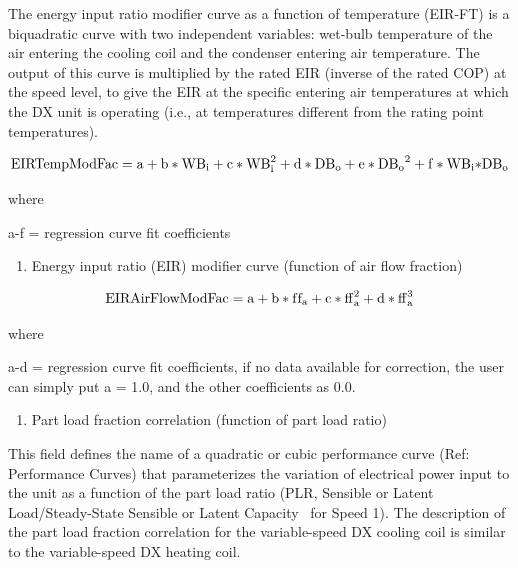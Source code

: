 The energy input ratio modifier curve as a function of temperature (EIR-FT) is a biquadratic curve with two independent variables: wet-bulb temperature of the air entering the cooling coil and the condenser entering air temperature. The output of this curve is multiplied by the rated EIR (inverse of the rated COP) at the speed level, to give the EIR at the specific entering air temperatures at which the DX unit is operating (i.e., at temperatures different from the rating point temperatures).

\begin{equation}
{\rm{EIRTempModFac}} = {\rm{a}} + {\rm{b*W}}{{\rm{B}}_{\rm{i}}} + {\rm{c*WB}}_{\rm{i}}^2 + {\rm{d*D}}{{\rm{B}}_{\rm{o}}} + {\rm{e*D}}{{\rm{B}}_{\rm{o}}}^2 + {\rm{f*W}}{{\rm{B}}_{\rm{i}}}{\rm{*D}}{{\rm{B}}_{\rm{o}}}
\end{equation}

where

a-f = regression curve fit coefficients

\begin{enumerate}
\def\labelenumi{\arabic{enumi})}
\setcounter{enumi}{3}
\tightlist
\item
  Energy input ratio (EIR) modifier curve (function of air flow fraction)
\end{enumerate}

\begin{equation}
{\rm{EIRAirFlowModFac}} = {\rm{a}} + {\rm{b*f}}{{\rm{f}}_{\rm{a}}} + {\rm{c*ff}}_{\rm{a}}^2 + {\rm{d*ff}}_{\rm{a}}^3
\end{equation}

where

a-d = regression curve fit coefficients, if no data available for correction, the user can simply put a = 1.0, and the other coefficients as 0.0.

\begin{enumerate}
\def\labelenumi{\arabic{enumi})}
\setcounter{enumi}{4}
\tightlist
\item
  Part load fraction correlation (function of part load ratio)
\end{enumerate}

This field defines the name of a quadratic or cubic performance curve (Ref: Performance Curves) that parameterizes the variation of electrical power input to the unit as a function of the part load ratio (PLR, Sensible or Latent Load/Steady-State Sensible or Latent Capacity~ for Speed 1). The description of the part load fraction correlation for the variable-speed DX cooling coil is similar to the variable-speed DX heating coil.

